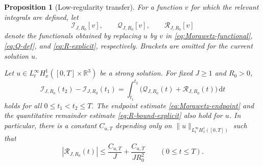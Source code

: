 \documentclass{interact}
\numberwithin{equation}{section}
\theoremstyle{plain}
\newtheorem{proposition}[theorem]{Proposition}
\theoremstyle{definition}
\theoremstyle{remark}
\newcommand{\R}{\mathbb R}
\newcommand{\dd}{\,\mathrm d}
\begin{document}
\begin{proposition}[Low-regularity transfer]\label{prop:low-regularity-transfer}
For a function $v$ for which the relevant integrals are defined, let
\[
 \mathcal I_{J,R_0}[v],\qquad
 \mathcal Q_{J,R_0}[v],\qquad
 \mathcal R_{J,R_0}[v]
\]
denote the functionals obtained by replacing $u$ by $v$ in \eqref{eq:Morawetz-functional}, \eqref{eq:Q-def}, and \eqref{eq:R-explicit}, respectively. Brackets are omitted for the current solution $u$.

Let $u\in L_t^\infty H_x^1([0,T]\times\R^3)$ be a strong solution. For fixed $J\ge1$ and $R_0>0$,
\begin{equation}\label{eq:integrated-Morawetz}
 \mathcal I_{J,R_0}(t_2)-\mathcal I_{J,R_0}(t_1)
 =\int_{t_1}^{t_2}
 \bigl(\mathcal Q_{J,R_0}(t)+\mathcal R_{J,R_0}(t)\bigr)\dd t
\end{equation}
holds for all $0\le t_1<t_2\le T$. The endpoint estimate \eqref{eq:Morawetz-endpoint} and the quantitative remainder estimate \eqref{eq:R-bound-explicit} also hold for $u$. In particular, there is a constant $C_{u,T}$ depending only on $\|u\|_{L_t^\infty H_x^1([0,T])}$ such that
\begin{equation}\label{eq:R-bound-finite-interval}
 |\mathcal R_{J,R_0}(t)|
 \le\frac{C_{u,T}}J+\frac{C_{u,T}}{JR_0^2}
 \qquad(0\le t\le T).
\end{equation}
\end{proposition}
\end{document}
